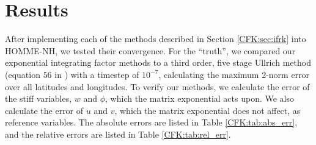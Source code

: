 \documentclass{csri19}
\begin{document}
\section{Results}\label{CFK:sec:results}
After implementing each of the methods described in Section 
\ref{CFK:sec:ifrk} into HOMME-NH, we tested their convergence. For the 
``truth'', we compared our exponential integrating factor methods to a 
third order, five stage Ullrich method (equation $56$ in 
\cite{CFK:Guerra2016}) with a timestep of $10^{-7}$, calculating the 
maximum $2$-norm error over all latitudes and longitudes. To verify our 
methods, we calculate the error of the stiff variables, $w$ and $\phi$, 
which the matrix exponential acts upon. We also calculate the error of $u$ 
and $v$, which the matrix exponential does not affect, as reference 
variables. The absolute errors are listed in Table \ref{CFK:tab:abs_err}, 
and the relative errors are listed in Table \ref{CFK:tab:rel_err}.
\end{document}
